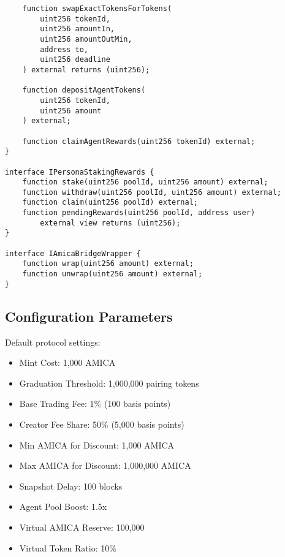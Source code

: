 \documentclass{article}
\begin{document}
\begin{appendices}
\begin{verbatim}
    function swapExactTokensForTokens(
        uint256 tokenId,
        uint256 amountIn,
        uint256 amountOutMin,
        address to,
        uint256 deadline
    ) external returns (uint256);
    
    function depositAgentTokens(
        uint256 tokenId,
        uint256 amount
    ) external;
    
    function claimAgentRewards(uint256 tokenId) external;
}

interface IPersonaStakingRewards {
    function stake(uint256 poolId, uint256 amount) external;
    function withdraw(uint256 poolId, uint256 amount) external;
    function claim(uint256 poolId) external;
    function pendingRewards(uint256 poolId, address user) 
        external view returns (uint256);
}

interface IAmicaBridgeWrapper {
    function wrap(uint256 amount) external;
    function unwrap(uint256 amount) external;
}
\end{verbatim}

\subsection{Configuration Parameters}

Default protocol settings:

\begin{itemize}
    \item Mint Cost: 1,000 AMICA
    \item Graduation Threshold: 1,000,000 pairing tokens
    \item Base Trading Fee: 1\% (100 basis points)
    \item Creator Fee Share: 50\% (5,000 basis points)
    \item Min AMICA for Discount: 1,000 AMICA
    \item Max AMICA for Discount: 1,000,000 AMICA
    \item Snapshot Delay: 100 blocks
    \item Agent Pool Boost: 1.5x
    \item Virtual AMICA Reserve: 100,000
    \item Virtual Token Ratio: 10\%
\end{itemize}

\end{appendices}
\end{document}
